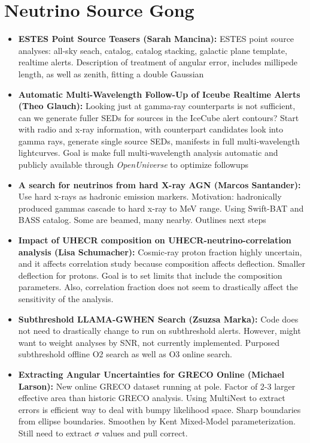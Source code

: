 \section*{Neutrino Source Gong}
\begin{itemize}
    \item \textbf{ESTES Point Source Teasers (Sarah Mancina):} ESTES point source analyses: all-sky seach, catalog, catalog stacking, galactic plane template, realtime alerts. Description of treatment of angular error, includes millipede length, as well as zenith, fitting a double Gaussian
    \item \textbf{Automatic Multi-Wavelength Follow-Up of Iceube Realtime Alerts (Theo Glauch):} Looking just at gamma-ray counterparts is not sufficient, can we generate fuller SEDs for sources in the IceCube alert contours? Start with radio and x-ray information, with counterpart candidates look into gamma rays, generate single source SEDs, manifests in full multi-wavelength lightcurves. Goal is make full multi-wavelength analysis automatic and publicly available through \textit{OpenUniverse} to optimize followups
    \item \textbf{A search for neutrinos from hard X-ray AGN (Marcos Santander):} Use hard x-rays as hadronic emission markers. Motivation: hadronically produced gammas cascade to hard x-ray to MeV range. Using Swift-BAT and BASS catalog. Some are beamed, many nearby. Outlines next steps
    \item \textbf{Impact of UHECR composition on UHECR-neutrino-correlation analysis (Lisa Schumacher):} Cosmic-ray proton fraction highly uncertain, and it affects correlation study because composition affects deflection. Smaller deflection for protons. Goal is to set limits that include the composition parameters. Also, correlation fraction does not seem to drastically affect the sensitivity of the analysis.
    \item \textbf{Subthreshold LLAMA-GWHEN Search (Zsuzsa Marka):} Code does not need to drastically change to run on subthreshold alerts. However, might want to weight analyses by SNR, not currently implemented. Purposed subthreshold offline O2 search as well as O3 online search. 
    \item \textbf{Extracting Angular Uncertainties for GRECO Online (Michael Larson):} New online GRECO dataset running at pole. Factor of 2-3 larger effective area than historic GRECO analysis. Using MultiNest to extract errors is efficient way to deal with bumpy likelihood space. Sharp boundaries from ellipse boundaries. Smoothen by Kent Mixed-Model parameterization. Still need to extract $\sigma$ values and pull correct. 

\end{itemize}
